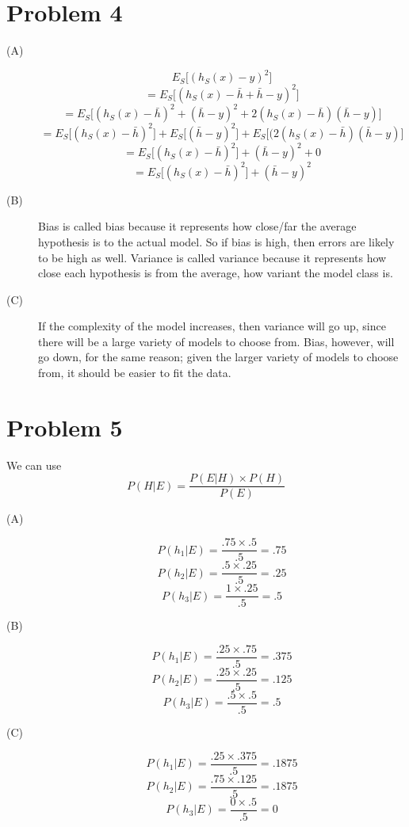 \documentclass{article}
\begin{document}
\section*{Problem 4}
\begin{description}
    \item[(A)]
        \[ E_S \Big[ (h_S(x) - y)^2 \Big] \]
        \[ = E_S \Big[ (h_S(x) - \bar{h} + \bar{h} - y)^2 \Big] \]
        \[ = E_S \Big[ (h_S(x) - \bar{h})^2 + (\bar{h} - y)^2 +
            2(h_S(x) - \bar{h})(\bar{h} - y) \Big] \]
        \[ = E_S \Big[ (h_S(x) - \bar{h})^2 \Big] +
            E_S \Big[ (\bar{h} - y)^2 \Big] +
            E_S \Big[ (2(h_S(x) - \bar{h})(\bar{h} - y) \Big] \]
        \[ = E_S \Big[ (h_S(x) - \bar{h})^2 \Big] +
            (\bar{h} - y)^2 + 0 \]
        \[ = E_S \Big[ (h_S(x) - \bar{h})^2 \Big] +
            (\bar{h} - y)^2 \]
    \item[(B)]
        Bias is called bias because it represents how close/far the average
        hypothesis is to the actual model. So if bias is high, then errors
        are likely to be high as well. Variance is called variance because
        it represents how close each hypothesis is from the average, how
        variant the model class is.
    \item[(C)]
        If the complexity of the model increases, then variance will go up,
        since there will be a large variety of models to choose from. Bias,
        however, will go down, for the same reason; given the larger variety
        of models to choose from, it should be easier to fit the data.
\end{description}

\section*{Problem 5}
We can use
\[ P(H | E) = \frac{P(E | H) \times P(H)}{P(E)} \]
\begin{description}
    \item[(A)]
        \[ P(h_1 | E) = \frac{.75 \times .5}{.5} = .75 \]
        \[ P(h_2 | E) = \frac{.5 \times .25}{.5} = .25 \]
        \[ P(h_3 | E) = \frac{1 \times .25}{.5} = .5 \]
    \item[(B)]
        \[ P(h_1 | E) = \frac{.25 \times .75}{.5} = .375 \]
        \[ P(h_2 | E) = \frac{.25 \times .25}{.5} = .125 \]
        \[ P(h_3 | E) = \frac{.5 \times .5}{.5} = .5 \]
    \item[(C)]
        \[ P(h_1 | E) = \frac{.25 \times .375}{.5} = .1875 \]
        \[ P(h_2 | E) = \frac{.75 \times .125}{.5} = .1875 \]
        \[ P(h_3 | E) = \frac{0 \times .5}{.5} = 0 \]
\end{description}
\end{document}
